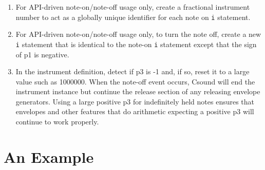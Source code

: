 \documentclass[12pt,letterpaper,onecolumn]{scrartcl}
\begin{document}
\begin{enumerate}
\begin{enumerate}
    \item For API-driven note-on/note-off usage only, create a fractional 
    instrument number to act as a globally unique identifier for each note on 
\texttt{i} statement.
    \item For API-driven note-on/note-off usage only, to turn the note off, 
    create a new \texttt{i} statement that is identical to the note-on 
\texttt{i} statement except that the sign of p1 is negative.
    \item In the instrument definition, detect if p3 is -1 and, if so, reset 
    it to a large value such as 1000000. When the note-off event occurs, 
Csound will end the instrument instance but continue the release section of 
any releasing envelope generators. Using a large positive p3 for indefinitely 
held notes ensures that envelopes and other features that do arithmetic 
expecting a positive p3 will continue to work properly.
\end{enumerate}
		
\end{enumerate}
\section{An Example}
\label{sec:AnExample}
\end{document}
